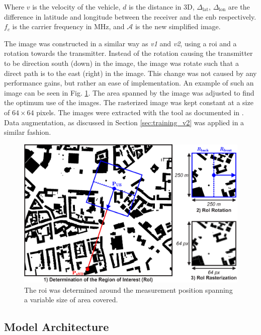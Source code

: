 Where $v$ is the velocity of the vehicle, $d$ is the distance in $3$D, $\Delta_\text{lat}$, $\Delta_\text{lon}$ are the difference in latitude and longitude between the receiver and the \gls{enb} respectively. $f_c$ is the carrier frequency in MHz, and $\mathcal{A}$ is the new simplified image.

The image was constructed in a similar way as \emph{v1} and \emph{v2}, using a \gls{roi} and a rotation towards the transmitter. Instead of the rotation causing the transmitter to be direction south (down) in the image, the image was rotate such that a direct path is to the east (right) in the image. This change was not caused by any performance gains, but rather an ease of implementation. An example of such an image can be seen in Fig. \ref{fig:roi_image_preperation}. The area spanned by the image was adjusted to find the optimum use of the images. The rasterized image was kept constant at a size of $64 \times 64$ pixels. The images were extracted with the tool as documented in \cite{SliwaLightweightNetworks}. Data augmentation, as discussed in Section \ref{sec:training_v2} was applied in a similar fashion.


\begin{figure}
    \centering
    \includegraphics{chapters/part_pathloss/osm_images_paper/figures/map_to_image.eps}
    \caption{The \gls{roi} was determined around the measurement position spanning a variable size of area covered.}
    \label{fig:roi_image_preperation}
\end{figure}

\subsection{Model Architecture}

